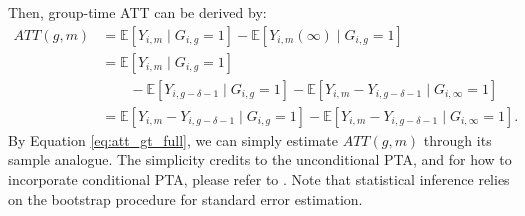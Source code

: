 \clearpage\newpage
Then, group-time ATT can be derived by:
\begin{align} \label{eq:att_gt_full}
ATT(g, m)
&=
\mathbb{E}[
    Y_{i, m}
    \mid G_{i, g} = 1
]
-
\mathbb{E}[
    Y_{i, m}(\infty)
    \mid G_{i, g} = 1
]
\nonumber \\
&=
\mathbb{E}[
    Y_{i, m}
    \mid G_{i, g} = 1
]
\nonumber \\
&\quad\quad
- \mathbb{E}[Y_{i, g-\delta-1} \mid G_{i, g} = 1]
-
\mathbb{E}[Y_{i, m} - Y_{i, g-\delta-1} \mid G_{i, \infty} = 1]
\nonumber \\
&=
\mathbb{E}[Y_{i, m} - Y_{i, g-\delta-1} \mid G_{i, g} = 1]
-
\mathbb{E}[Y_{i, m} - Y_{i, g-\delta-1} \mid G_{i, \infty} = 1].
\end{align}
By Equation \ref{eq:att_gt_full}, we can simply estimate $ATT(g, m)$ through its sample analogue. The simplicity credits to the unconditional PTA, and for how to incorporate conditional PTA, please refer to \cite{callaway2021difference}.
Note that statistical inference relies on the bootstrap procedure for standard error estimation.




